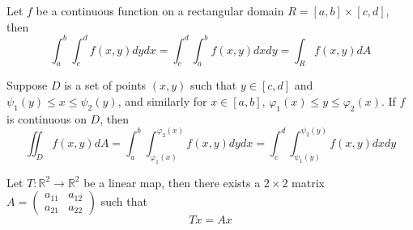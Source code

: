 \documentclass[openany]{book}
\newcommand{\R}{\mathbb{R}}
\begin{document}


\begin{prop}
    Let $f$ be a continuous function on a rectangular domain $R=[a,b]\times[c,d]$, then 
    \begin{equation*}
        \int_a^b\int_c^df(x,y)dydx=\int_c^d\int_a^bf(x,y)dxdy=\int_Rf(x,y)dA
    \end{equation*}
\end{prop}

\begin{prop}
    Suppose $D$ is a set of points $(x,y)$ such that $y\in [c,d]$ and $\psi_1(y)\leq x\leq\psi_2(y)$, and similarly for $x\in [a,b]$, $\varphi_1(x)\leq y\leq\varphi_2(x)$. If $f$ is continuous on $D$, then 
    \begin{equation*}
        \iint_Df(x,y)dA=\int_a^b\int_{\varphi_1(x)}^{\varphi_2(x)}f(x,y)dydx=\int_c^d\int_{\psi_1(y)}^{\psi_2(y)}f(x,y)dxdy
    \end{equation*}
\end{prop}

\begin{prop}
    Let $T:\R^2\to\R^2$ be a linear map, then there exists a $2\times 2$ matrix $A=\begin{pmatrix}
        a_{11}&a_{12}\\
        a_{21}&a_{22}
    \end{pmatrix}$ such that 
    \begin{equation*}
        Tx=Ax
    \end{equation*}
\end{prop}
\end{document}
